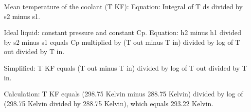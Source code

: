 Mean temperature of the coolant (T KF):  
Equation: Integral of T ds divided by s2 minus s1.  

Ideal liquid: constant pressure and constant Cp.  
Equation: h2 minus h1 divided by s2 minus s1 equals Cp multiplied by (T out minus T in) divided by log of T out divided by T in.  

Simplified:  
T KF equals (T out minus T in) divided by log of T out divided by T in.  

Calculation:  
T KF equals (298.75 Kelvin minus 288.75 Kelvin) divided by log of (298.75 Kelvin divided by 288.75 Kelvin), which equals 293.22 Kelvin.
